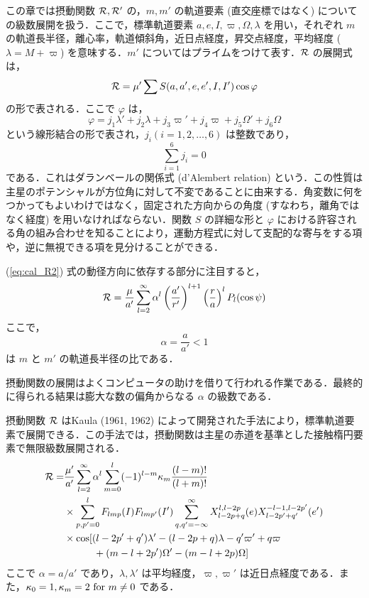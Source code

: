 \documentclass[11pt,a4paper,oneside,onecolumn]{jreport}
\begin{document}
この章では摂動関数 ${\cal R}, {\cal R'}$ の，$m, m'$ の軌道要素 (直交座標ではなく) についての級数展開を扱う．ここで，標準軌道要素 $a, e, I, \varpi, \Omega, \lambda$ を用い，それぞれ $m$ の軌道長半径，離心率，軌道傾斜角，近日点経度，昇交点経度，平均経度 ($\lambda = M + \varpi$) を意味する．$m'$ についてはプライムをつけて表す．${\cal R}$ の展開式は，
\begin{equation}
{\cal R} = \mu' \sum S (a,a',e,e',I,I') \cos \varphi \label{eq:cal_R_varphi}
\end{equation}
の形で表される．ここで $\varphi$ は，
\begin{equation}
\varphi = j_1 \lambda' + j_2 \lambda + j_3 \varpi' + j_4 \varpi + j_5 \Omega' + j_6 \Omega \label{eq:varphi}
\end{equation}
という線形結合の形で表され，$j_i (i = 1,2,…,6)$ は整数であり，
\begin{equation}
\sum_{i = 1}^{6} j_i = 0
\end{equation}
である．これはダランベールの関係式 (d'Alembert relation) という．この性質は主星のポテンシャルが方位角に対して不変であることに由来する．角変数に何をつかってもよいわけではなく，固定された方向からの角度 (すなわち，離角ではなく経度) を用いなければならない．関数 $S$ の詳細な形と $\varphi$ における許容される角の組み合わせを知ることにより，運動方程式に対して支配的な寄与をする項や，逆に無視できる項を見分けることができる．

(\ref{eq:cal_R2}) 式の動径方向に依存する部分に注目すると，
\begin{equation}
{\cal R} = \frac{\mu}{a'} \sum_{l = 2}^{\infty} \alpha^l \left( \frac{a'}{r'} \right)^{l+1} \left( \frac{r}{a} \right)^l P_l (\cos \psi)
\end{equation}
ここで，
\begin{equation}
\alpha = \frac{a}{a'} < 1
\end{equation}
は $m$ と $m'$ の軌道長半径の比である．

摂動関数の展開はよくコンピュータの助けを借りて行われる作業である．最終的に得られる結果は膨大な数の偏角からなる $\alpha$ の級数である．

摂動関数 ${\cal R}$ はKaula (1961, 1962) によって開発された手法により，標準軌道要素で展開できる．この手法では，摂動関数は主星の赤道を基準とした接触楕円要素で無限級数展開される．
\begin{equation}
\begin{split}
{\cal R} = & \frac{\mu'}{a'} \sum_{l = 2}^{\infty} \alpha^l \sum_{m = 0}^l (-1)^{l - m} \kappa_m \frac{(l - m) !}{(l + m) !} \\
& \times \sum_{p,p' = 0}^l F_{lmp} (I) F_{lmp'} (I') \sum_{q,q' = - \infty}^{\infty} X_{l - 2p + q}^{l, l - 2p} (e) X_{l - 2p' + q'}^{-l -1, l - 2p'} (e') \\
& \times \cos [ (l - 2p' + q') \lambda' - (l - 2p + q) \lambda - q' \varpi' + q \varpi \\
& \quad \quad \quad+ (m - l + 2p') \Omega' - (m - l + 2p) \Omega ]
\end{split}
\end{equation}
ここで $\alpha = a / a'$ であり，$\lambda, \lambda'$ は平均経度，$\varpi, \varpi'$ は近日点経度である．また，$\kappa_0 = 1, \kappa_m = 2 \ {\rm for} \ m \not = 0$ である．
\end{document}
